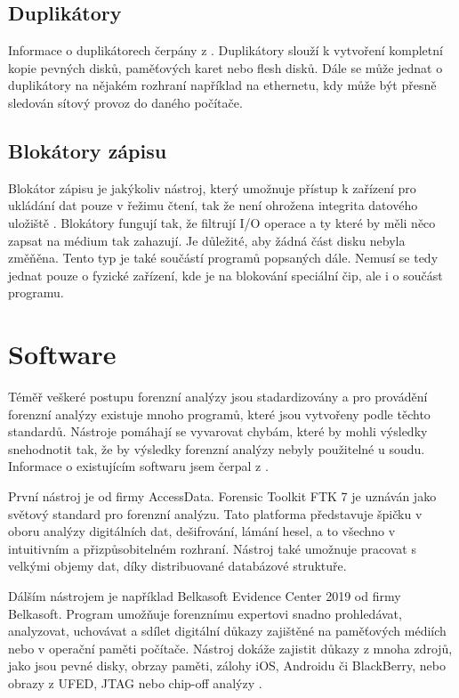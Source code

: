 \documentclass[thesis=B,czech]{FITthesis}[2012/06/26]
\begin{document}
\subsection{Duplikátory}
\label{duplikatory}
Informace o duplikátorech čerpány z \cite{for_hard}. Duplikátory slouží k vytvoření kompletní kopie pevných disků, paměťových karet nebo flesh disků. Dále se může jednat o duplikátory na nějakém rozhraní například na ethernetu, kdy může být přesně sledován sítový provoz do daného počítače.
\subsection{Blokátory zápisu}
\label{blokatory}
Blokátor zápisu je jakýkoliv nástroj, který umožnuje přístup k zařízení pro ukládání dat pouze v řežimu čtení, tak že není ohrožena integrita datového uložiště \cite{for_hard2}. Blokátory fungují tak, že filtrují I/O operace a ty které by měli něco zapsat na médium tak zahazují. Je důležité, aby žádná část disku nebyla změňěna. Tento typ je také součástí programů popsaných dále. Nemusí se tedy jednat pouze o fyzické zařízení, kde je na blokování speciální čip, ale i o součást programu.

\section{Software}

Téměř veškeré postupu forenzní analýzy jsou stadardizovány a pro provádění forenzní analýzy existuje mnoho programů, které jsou vytvořeny podle těchto standardů. Nástroje pomáhají se vyvarovat chybám, které by mohli výsledky snehodnotit tak, že by výsledky forenzní analýzy nebyly použitelné u soudu. Informace o existujícím softwaru jsem čerpal z \cite{for_soft}.

První nástroj je od firmy AccessData. Forensic Toolkit FTK 7 je uznáván jako světový standard pro forenzní analýzu. Tato platforma představuje špičku v oboru analýzy digitálních dat, dešifrování, lámání hesel, a to všechno v intuitivním a přizpůsobitelném rozhraní. Nástroj také umožnuje pracovat s velkými objemy dat, díky distribuované databázové struktuře.

Dálším nástrojem je například Belkasoft Evidence Center 2019 od firmy Belkasoft. Program umožňuje forenznímu expertovi snadno prohledávat, analyzovat, uchovávat a sdílet digitální důkazy zajištěné na paměťových médiích nebo v operační paměti počítače. Nástroj dokáže zajistit důkazy z mnoha zdrojů, jako jsou pevné disky, obrzay paměti, zálohy iOS, Androidu či BlackBerry, nebo obrazy z UFED, JTAG nebo chip-off analýzy \cite{for_soft}.
\end{document}
